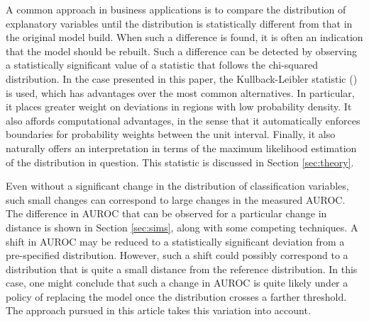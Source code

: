 A common approach in business applications is to compare the distribution of explanatory variables until the distribution is statistically different from that in the original model build.
When such a difference is found, it is often an indication that the model should be rebuilt.
Such a difference can be detected by observing a statistically significant value of a statistic that follows the chi-squared distribution.
In the case presented in this paper, the Kullback-Leibler statistic (\citet{kullbackliebler1951}) is used, which has advantages over the most common alternatives.
In particular, it places greater weight on deviations in regions with low probability density.
It also affords computational advantages, in the sense that it automatically enforces boundaries for probability weights between the unit interval.
Finally, it also naturally offers an interpretation in terms of the maximum likelihood estimation of the distribution in question.
This statistic is discussed in Section \ref{sec:theory}.


Even without a significant change in the distribution of classification variables, such small changes can correspond to large changes in the measured AUROC.
The difference in AUROC that can be observed for a particular change in distance is shown in Section \ref{sec:sims}, along with some competing techniques.
A shift in AUROC may be reduced to a statistically significant
deviation from a pre-specified distribution.
However, such a shift could possibly correspond to a distribution that is quite a small distance from the reference distribution.
In this case, one might conclude that such a change in AUROC is quite likely under a policy of replacing the model once the distribution crosses a farther threshold.
The approach pursued in this article takes this variation into account.



